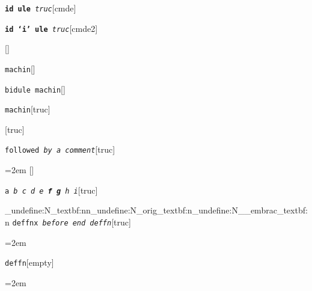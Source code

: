 \documentclass{book}
\begin{document}
%
\noindent\texttt{\textbf{id ule} \EmbracOn{}\textnormal{\textsl{truc}}\EmbracOff{}}\hfill[cmde]



%
\noindent\texttt{\textbf{id `\texttt{i}' ule} \EmbracOn{}\textnormal{\textsl{truc}}\EmbracOff{}}\hfill[cmde2]



%
\noindent\texttt{}\hfill[]



\noindent\texttt{machin}\hfill[]



%
\noindent\texttt{bidule machin}\hfill[]



%
\noindent\texttt{machin}\hfill[truc]



%
\noindent\texttt{}\hfill[truc]



\noindent\texttt{followed \EmbracOn{}\textnormal{\textsl{by a comment}}\EmbracOff{}}\hfill[truc]



%
\par\begingroup\obeylines\obeyspaces\frenchspacing\leftskip=2em \parskip=0pt \parindent=0pt \ttfamily%
\endgroup{}%
\noindent\texttt{}\hfill[]



\noindent\texttt{a \EmbracOn{}\textnormal{\textsl{b c d e \textbf{f g} h i}}\EmbracOff{}}\hfill[truc]


\ExplSyntaxOn%
\cs_undefine:N{\embrac_textbf:nn}\cs_undefine:N{\embrac_orig_textbf:n}\cs_undefine:N{\__embrac_textbf:n}%
\ExplSyntaxOff%
%
\noindent\texttt{deffnx \EmbracOn{}\textnormal{\textsl{before end deffn}}\EmbracOff{}}\hfill[truc]



%
\par\begingroup\obeylines\obeyspaces\frenchspacing\leftskip=2em \parskip=0pt \parindent=0pt \ttfamily%


\endgroup{}%
\noindent\texttt{deffn}\hfill[empty]



%
\par\begingroup\obeylines\obeyspaces\frenchspacing\leftskip=2em \parskip=0pt \parindent=0pt \ttfamily%
\end{document}
